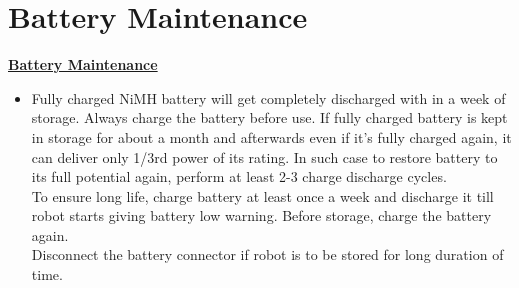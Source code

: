 \documentclass[a4paper,12pt,oneside]{book}
\begin{document}
	\chapter[Battery Maintenance]{Battery Maintenance}
	\underline{\textbf{\Large{Battery Maintenance}}}
	\begin{itemize}
		\item {Fully charged NiMH battery will get completely discharged with in a week of storage. Always
			charge the battery before use. If fully charged battery is kept in storage for about a month and
			afterwards even if it’s fully charged again, it can deliver only 1/3rd power of its rating. In such
			case to restore battery to its full potential again, perform at least 2-3 charge discharge cycles.\\
			To ensure long life, charge battery at least once a week and discharge it till robot starts giving
			battery low warning. Before storage, charge the battery again.\\
			Disconnect the battery connector if robot is to be stored for long duration of time.}
	\end{itemize}
	
\end{document}

